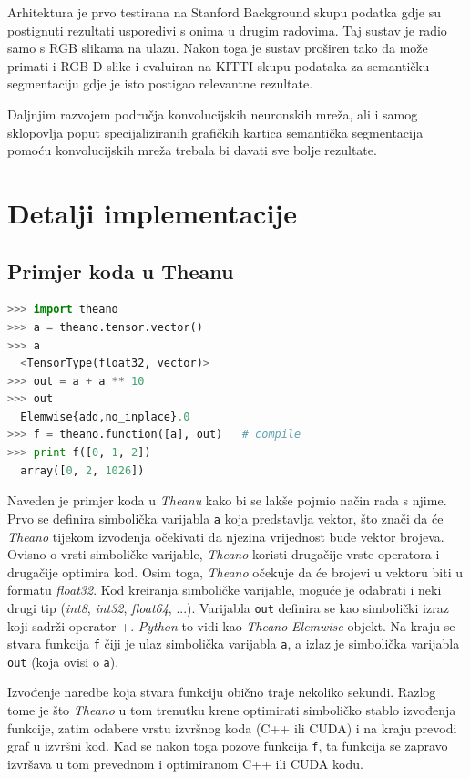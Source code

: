 \documentclass[times, utf8, diplomski, numeric]{fer}
\begin{document}
Arhitektura je prvo testirana na Stanford Background skupu podatka gdje su postignuti rezultati usporedivi s onima u drugim radovima. Taj sustav je radio samo s RGB slikama na ulazu. Nakon toga je sustav proširen tako da može primati i RGB-D slike i evaluiran na KITTI skupu podataka za semantičku segmentaciju gdje je isto postigao relevantne rezultate.

Daljnjim razvojem područja konvolucijskih neuronskih mreža, ali i samog sklopovlja poput specijaliziranih grafičkih kartica semantička segmentacija pomoću konvolucijskih mreža trebala bi davati sve bolje rezultate.




\appendix

\chapter{Detalji implementacije}
\section{Primjer koda u Theanu}

\begin{lstlisting}[language=python]
>>> import theano
>>> a = theano.tensor.vector()
>>> a
  <TensorType(float32, vector)>
>>> out = a + a ** 10
>>> out
  Elemwise{add,no_inplace}.0
>>> f = theano.function([a], out)   # compile
>>> print f([0, 1, 2])
  array([0, 2, 1026])
\end{lstlisting}
Naveden je primjer koda u \textit{Theanu} kako bi se lakše pojmio način rada s njime. Prvo se definira simbolička varijabla \texttt{a} koja predstavlja vektor, što znači da će \textit{Theano} tijekom izvođenja očekivati da njezina vrijednost bude vektor brojeva. Ovisno o vrsti simboličke varijable, \textit{Theano} koristi drugačije vrste operatora i drugačije optimira kod. Osim toga, \textit{Theano} očekuje da će brojevi u vektoru biti u formatu \textit{float32}. Kod kreiranja simboličke varijable, moguće je odabrati i neki drugi tip (\textit{int8}, \textit{int32}, \textit{float64}, ...). Varijabla \texttt{out} definira se kao simbolički izraz koji sadrži operator +. \textit{Python} to vidi kao \textit{Theano} \textit{Elemwise} objekt. Na kraju se stvara funkcija \texttt{f} čiji je ulaz simbolička varijabla \texttt{a}, a izlaz je simbolička varijabla \texttt{out} (koja ovisi o \texttt{a}).

Izvođenje naredbe koja stvara funkciju obično traje nekoliko sekundi. Razlog tome je što \textit{Theano} u tom trenutku krene optimirati simboličko stablo izvođenja funkcije, zatim odabere vrstu izvršnog koda (C++ ili CUDA) i na kraju prevodi graf u izvršni kod. Kad se nakon toga pozove funkcija \texttt{f}, ta funkcija se zapravo izvršava u tom prevednom i optimiranom C++ ili CUDA kodu.
\end{document}
